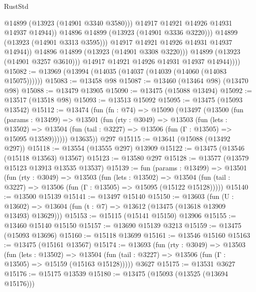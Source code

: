 \begin{lexlean}{RustStd}
\begin{coremodule}
{\begin{coremodule}
{{{{{{{{{{{{{{{{{{{{{{{{{{{{{{{{{{{{{                              @14899
                              (@13923 (@14901 @3340 @3580)))
                            @14917
                            @14921
                            @14926
                            @14931
                            @14937
                            @14944))
                        @14896
                        @14899
                        (@13923 (@14901 @3336 @3220)))
                      @14899
                      (@13923 (@14901 @3313 @3595)))
                    @14917
                    @14921
                    @14926
                    @14931
                    @14937
                    @14944))
                @14896
                @14899
                (@13923 (@14901 @3308 @3220)))
              @14899
              (@13923 (@14901 @3257 @3610)))
            @14917
            @14921
            @14926
            @14931
            @14937
            @14944))))
@15082 := @13969 (@13994 (@14035 (@14037 (@14039 (@14060 (@14083 @15075))))))
@15083 := @13458 @98
@15087 := @13460 (@13464 @98) (@13470 @98)
@15088 := @13479 @13905
@15090 := @13475 (@15088 @13494)
@15092 := @13517 (@13518 @98)
@15093 := @13513 @15092
@15095 := @13475 (@15093 @13542)
@15112 := @13474
    (fun (fn : @74) =>
    @15090
      (@13497
        (@13500
          (fun (params : @13499) =>
          @13501
            (fun (rty : @3049) =>
            @13503
              (fun (lets : @13502) =>
              @13504 (fun (tail : @3227) => @13506 (fun (Γ : @13505) => @15095 @13589))))))
        @13635))
    @297
@15115 := @13641 (@15088 (@13492 @297))
@15118 := @13554 (@13555 @297) @13909
@15122 := @13475 (@13546 (@15118 @13563) @13567)
@15123 := @13580 @297
@15128 := @13577 (@13579 @15123 @13913 @13535 @13537)
@15139 := fun (params : @13499) =>
  @13501
    (fun (rty : @3049) =>
    @13503
      (fun (lets : @13502) =>
      @13504 (fun (tail : @3227) => @13506 (fun (Γ : @13505) => @15095 (@15122 @15128)))))
@15140 := @13500 @15139
@15141 := @13497 @15140
@15150 := @13603
    (fun (U : @13602) => @13604 (fun (t : @7) => @13612 (@13475 (@13618 @13909 @13493) @13629)))
@15153 := @15115 (@15141 @15150) @13906
@15155 := @13460 @15140 @15150
@15157 := @13690 @15139 @3213
@15159 := @13475 (@15093 @13696)
@15160 := @15118 @13699
@15161 := @13546 @15160
@15163 := @13475 (@15161 @13567)
@15174 := @13693
    (fun (rty : @3049) =>
    @13503
      (fun (lets : @13502) =>
      @13504 (fun (tail : @3227) => @13506 (fun (Γ : @13505) => @15159 (@15163 @15128)))))
    @3627
@15175 := @13531 @3627
@15176 := @15175 @13539
@15180 := @13475 (@15093 (@13525 (@13694 @15176)))
}}}}}}}}}}}}}}}}}}}}}}}}}}}}}}}}}}}}}
\end{coremodule}}
\end{coremodule}
\end{lexlean}
